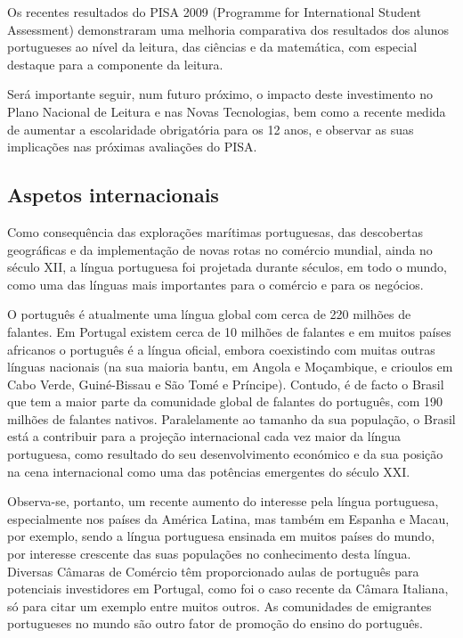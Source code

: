 \begin{multicols}{2}
Os recentes resultados do PISA 2009 (Programme for International Student Assessment) demonstraram uma melhoria comparativa dos resultados dos alunos portugueses ao nível da leitura, das ciências e da matemática, com especial destaque para a componente da leitura. 

Será importante seguir, num futuro próximo, o impacto deste investimento no Plano Nacional de Leitura e nas Novas Tecnologias, bem como a recente medida de aumentar a escolaridade obrigatória para os 12 anos, e observar as suas implicações nas próximas avaliações do PISA.

\subsection{Aspetos internacionais}

Como consequência das explorações marítimas portuguesas, das descobertas geográficas e da implementação de novas rotas no comércio mundial, ainda no século XII, a língua portuguesa foi projetada durante séculos, em todo o mundo, como uma das línguas mais importantes para o comércio e para os negócios.

O português é atualmente uma língua global com cerca de 220 milhões de falantes. Em Portugal existem cerca de 10 milhões de falantes\cite{census} e em muitos países africanos o português é a língua oficial, em\-bo\-ra coexistindo com muitas outras línguas nacionais (na sua maioria bantu, em Angola e Moçambique, e crioulos em Cabo Verde, Guiné-Bissau e São Tomé e Príncipe). Contudo, é de facto o Brasil que tem a maior parte da comunidade global de falantes do português, com 190 milhões de falantes nativos. Paralelamente ao tamanho da sua população, o Brasil está a contribuir para a projeção internacional cada vez maior da língua portuguesa, como resultado do seu desenvolvimento económico e da sua posição na cena internacional como uma das potências emergentes do século XXI. 


Observa-se, portanto, um recente aumento do interesse pela língua portuguesa, especialmente nos países da América Latina, mas também em Espanha e Macau, por exemplo, sendo a língua portuguesa ensinada em muitos países do mundo\cite{camoes2}, por interesse crescente das suas populações no conhecimento desta língua. Diversas Câmaras de Comércio têm proporcionado aulas de português para potenciais investidores em Portugal, como foi o caso recente da Câmara Italiana, só para citar um exemplo entre muitos outros. As comunidades de emigrantes portugueses no mundo são outro fator de promoção do ensino do português.


\end{multicols}
